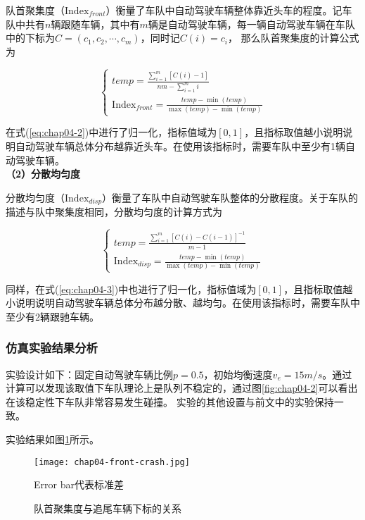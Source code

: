 队首聚集度（$\mathrm{Index}_{front}$）衡量了车队中自动驾驶车辆整体靠近头车的程度。记车队中共有$n$辆跟随车辆，其中有$m$辆是自动驾驶车辆，每一辆自动驾驶车辆在车队中的下标为$C = (c_1, c_2, \cdots, c_m)$，同时记$C(i) = c_i$，
那么队首聚集度的计算公式为

\begin{equation}
    \begin{cases}
      temp = \frac{\sum_{i=1}^{m}[C(i) - 1 ]}{nm - \sum_{i=1}^{m}i} \\
      \mathrm{Index}_{front} = \frac{temp - \min(temp)}{\max(temp) - \min(temp)}
    \end{cases}
    \label{eq:chap04-2}
\end{equation}

在式(\ref{eq:chap04-2})中进行了归一化，指标值域为$[0,1]$，且指标取值越小说明说明自动驾驶车辆总体分布越靠近头车。在使用该指标时，需要车队中至少有1辆自动驾驶车辆。 \\

\noindent \textbf{（2）分散均匀度}

分散均匀度（$\mathrm{Index}_{disp}$）衡量了车队中自动驾驶车队整体的分散程度。关于车队的描述与队中聚集度相同，分散均匀度的计算方式为

\begin{equation}
    \begin{cases}
      temp = \frac{\sum_{i=1}^m [C(i)-C(i-1)]^{-1}}{m-1} \\
      \mathrm{Index}_{disp} = \frac{temp - \min(temp)}{\max(temp) - \min(temp)}
    \end{cases}
    \label{eq:chap04-3}
\end{equation}

同样，在式(\ref{eq:chap04-3})中也进行了归一化，指标值域为$[0,1]$，且指标取值越小说明说明自动驾驶车辆总体分布越分散、越均匀。在使用该指标时，需要车队中至少有2辆跟驰车辆。

\subsubsection{仿真实验结果分析}

实验设计如下：固定自动驾驶车辆比例$p=0.5$，初始均衡速度$v_e = 15m/s$。通过计算可以发现该取值下车队理论上是队列不稳定的，通过图\ref{fig:chap04-2}可以看出在该稳定性下车队非常容易发生碰撞。
实验的其他设置与前文中的实验保持一致。

实验结果如图\ref{fig:chap04-5}所示。

\begin{figure}
    \centering
    \texttt{[image: chap04-front-crash.jpg]}
    \caption*{Error bar代表标准差}
    \caption{队首聚集度与追尾车辆下标的关系}
    \label{fig:chap04-5}
\end{figure} 

